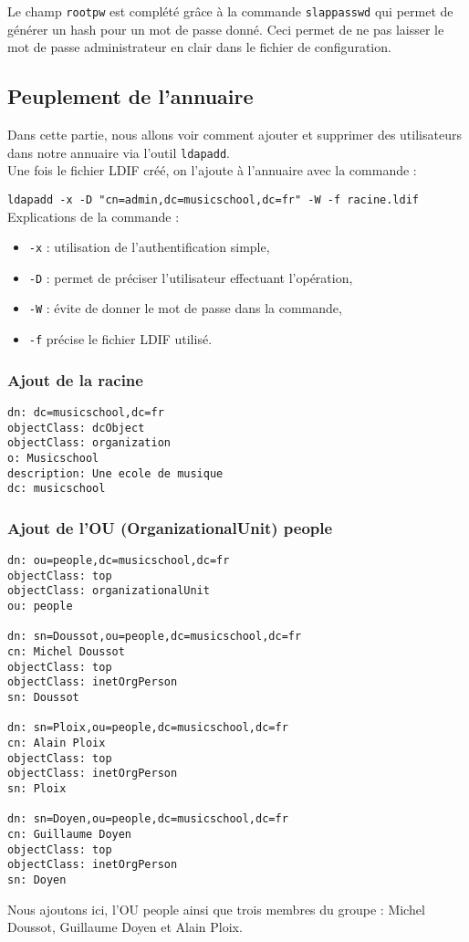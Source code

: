 \documentclass[12pt,a4paper,notitlepage]{article}
\begin{document}
Le champ  \texttt{rootpw} est complété grâce à la commande \texttt{slappasswd} qui permet de générer un hash pour un mot de passe donné. Ceci permet de ne pas laisser le mot de passe administrateur en clair dans le fichier de configuration.\\


\subsection{Peuplement de l'annuaire}
Dans cette partie, nous allons voir comment ajouter et supprimer des utilisateurs dans notre annuaire via l'outil \texttt{ldapadd}.\\

Une fois le fichier LDIF créé, on l'ajoute à l'annuaire avec la commande :

\noindent \texttt{ldapadd -x -D "cn=admin,dc=musicschool,dc=fr" -W -f racine.ldif}\\

\noindent Explications de la commande :
\begin{itemize}
\item \texttt{-x} : utilisation de l'authentification simple,
\item \texttt{-D} : permet de préciser l'utilisateur effectuant l'opération,
\item \texttt{-W} : évite de donner le mot de passe dans la commande,
\item \texttt{-f} précise le fichier LDIF utilisé. 
\end{itemize}


\subsubsection{Ajout de la racine}

\begin{lstlisting}[title=racine.ldif]
dn: dc=musicschool,dc=fr
objectClass: dcObject
objectClass: organization
o: Musicschool
description: Une ecole de musique 
dc: musicschool 
\end{lstlisting}


\subsubsection{Ajout de l'OU (OrganizationalUnit) people}

\begin{lstlisting}[title=people.ldif]
dn: ou=people,dc=musicschool,dc=fr
objectClass: top
objectClass: organizationalUnit
ou: people

dn: sn=Doussot,ou=people,dc=musicschool,dc=fr
cn: Michel Doussot
objectClass: top
objectClass: inetOrgPerson
sn: Doussot

dn: sn=Ploix,ou=people,dc=musicschool,dc=fr
cn: Alain Ploix
objectClass: top
objectClass: inetOrgPerson
sn: Ploix

dn: sn=Doyen,ou=people,dc=musicschool,dc=fr
cn: Guillaume Doyen
objectClass: top
objectClass: inetOrgPerson
sn: Doyen

\end{lstlisting}
Nous ajoutons ici, l'OU people ainsi que trois membres du groupe : Michel Doussot, Guillaume Doyen et Alain Ploix.
\end{document}
